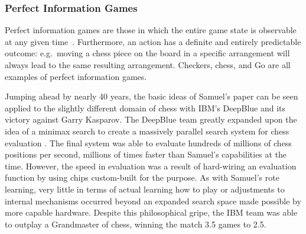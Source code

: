 

\subsubsection*{Perfect Information Games}

Perfect information games are those in which the entire game state is observable
at any given time~\cite{perfinfo}.
%
Furthermore,
an action has a definite and entirely predictable outcome:
e.g.\  moving a chess piece on the board in a specific arrangement will always
lead to the same resulting arrangement.
%
Checkers, chess, and Go are all examples of perfect information games.

Jumping ahead by nearly 40 years,
the basic ideas of Samuel's paper can be seen applied to the slightly different
domain of chess with IBM's DeepBlue
and its victory against Garry Kasparov.
%
The DeepBlue team greatly expanded upon the idea of a minimax search to create a
massively parallel search system for chess evaluation
\cite{ibm_deepblue}.
%
The final system was able to evaluate hundreds of millions of chess positions
per second,
millions of times faster than Samuel's capabilities at the time.
%
However,
the speed in evaluation was a result of hard-wiring an evaluation function
by using chips custom-built for the purpose.
%
As with Samuel's rote learning,
very little in terms of actual learning how to play or adjustments to internal
mechanisms occurred
beyond an expanded search space made possible by more capable hardware.
%
Despite this philosophical gripe,
the IBM team was able to outplay a Grandmaster of chess,
winning the match 3.5 games to 2.5.


